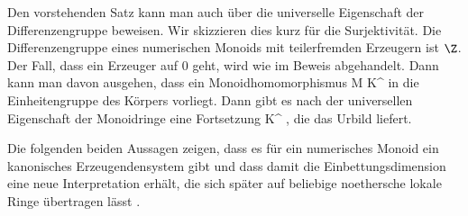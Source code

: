 {}
{
Den vorstehenden Satz kann man auch über die universelle Eigenschaft der Differenzengruppe beweisen. Wir skizzieren dies kurz für die Surjektivität. Die Differenzengruppe eines numerischen Monoids mit teilerfremden Erzeugern ist $\Z$. Der Fall, dass ein Erzeuger auf $0$ geht, wird wie im Beweis abgehandelt. Dann kann man davon ausgehen, dass ein Monoidhomomorphismus
\maabb {\varphi} { M } { K^\times
} {}
in die Einheitengruppe des Körpers vorliegt. Dann gibt es nach der universellen Eigenschaft der Monoidringe eine
 {} {}
Fortsetzung
\maabb {\tilde{\varphi}} { \Z } { K^\times
} {,}
die das Urbild liefert.
}

Die folgenden beiden Aussagen zeigen, dass es für ein numerisches Monoid ein kanonisches Erzeugendensystem gibt und dass damit die Einbettungsdimension eine neue Interpretation erhält, die sich später auf beliebige noethersche lokale Ringe übertragen lässt
 {} {.}






